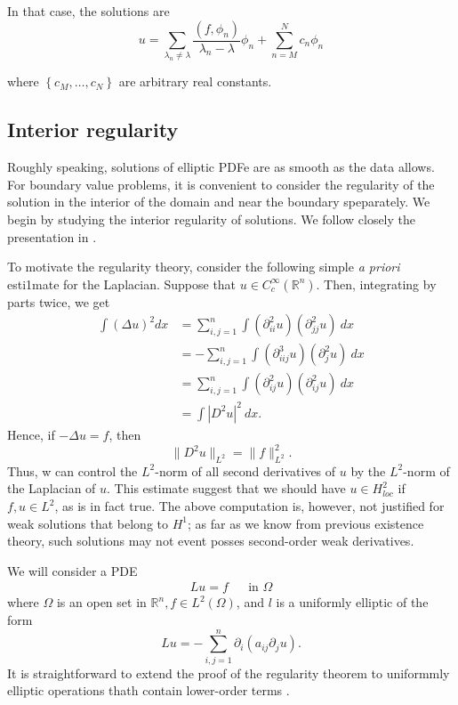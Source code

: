\documentclass[12pt,leqno]{article}
\numberwithin{equation}{section}
\begin{document}
\hfill\begin{minipage}{\dimexpr\textwidth-2cm}
In that case, the solutions are
$$u = \sum_{\lambda_n \neq \lambda} \frac{\left(f, \phi_n\right)}{\lambda_n - \lambda} \phi_n + \sum_{n=M}^{N} c_n \phi_n$$

where $\left\lbrace c_M,\dots,c_N\right\rbrace$ are arbitrary real constants.
\end{minipage}

\subsection{Interior regularity}

\setcounter{equation}{33}

Roughly speaking, solutions of elliptic PDFe are as smooth as the data allows.
For boundary value problems, it is convenient to consider the regularity of the
solution in the interior of the domain and near the boundary speparately. We begin
by studying the interior regularity of solutions. We follow closely the presentation
in \cite{SomePresentation}.

To motivate the regularity theory, consider the following simple \emph{a priori} esti\-1mate
for the Laplacian. Suppose that $u \in C_c^{\infty}(\mathbb{R}^n)$. Then, integrating by parts
twice, we get
\begin{equation*}
\begin{split}
\int (\Delta u)^2 dx & = \sum_{i,j=1}^{n} \int (\partial_{ii}^2 u) (\partial_{jj}^2 u) \ dx \\
& = - \sum_{i,j=1}^{n} \int (\partial_{iij}^3 u) (\partial_{j}^2 u) \ dx \\
& = \sum_{i,j=1}^{n} \int (\partial_{ij}^2 u) (\partial_{ij}^2 u) \ dx \\
& = \int \left|D^2 u\right|^2 \ dx.
\end{split}
\end{equation*}
Hence, if $- \Delta u = f$, then
$$ \lVert D^2 u \rVert_{L^2} = \lVert f \rVert_{L^2}^2.$$
Thus, w can control the $L^2$-norm of all second derivatives of $u$ by the $L^2$-norm
of the Laplacian of $u$. This estimate suggest that we should have $u \in H_{loc}^2$ if
$f, u \in L^2$, as is in fact true. The above computation is, however, not justified for
weak solutions that belong to $H^1$; as far as we know from previous existence
theory, such solutions may not event posses second-order weak derivatives.

We will consider a PDE
\begin{align}
\label{eq:firstEq}
Lu = f && \text{in } \Omega
\end{align}
where $\Omega$ is an open set in $\mathbb{R}^n, f \in L^2(\Omega)$, and $l$ is a uniformly elliptic of the form
\begin{equation}
\label{eq:secondEq}
Lu = - \sum_{i,j=1}^{n} \partial_i (a_{ij} \partial_j u).
\end{equation}
It is straightforward to extend the proof of the regularity theorem to uniformmly
elliptic operations thath contain lower-order terms \cite{SomePresentation}.
\end{document}

